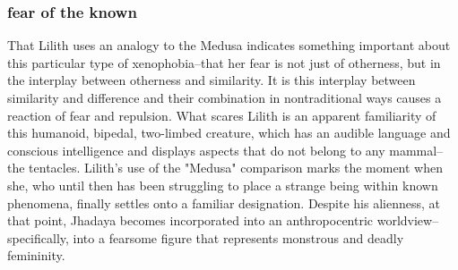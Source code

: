 \documentclass[11pt]{article}
\begin{document}
\subsubsection{fear of the known}
\label{sec:orgc739112}
That Lilith uses an analogy to the Medusa indicates something
important about this particular type of xenophobia--that her fear is
not just of otherness, but in the interplay between otherness and
similarity. It is this interplay between similarity and difference and
their combination in nontraditional ways causes a reaction of fear and
repulsion. What scares Lilith is an apparent familiarity of this humanoid,
bipedal, two-limbed creature, which has an audible language and
conscious intelligence and displays aspects that do not belong to any
mammal--the tentacles. Lilith's use of the "Medusa" comparison marks
the moment when she, who until then has been struggling to place a
strange being within known phenomena, finally settles onto a familiar
designation. Despite his alienness, at that point, Jhadaya becomes
incorporated into an anthropocentric worldview--specifically, into a
fearsome figure that represents monstrous and deadly femininity.
\end{document}
